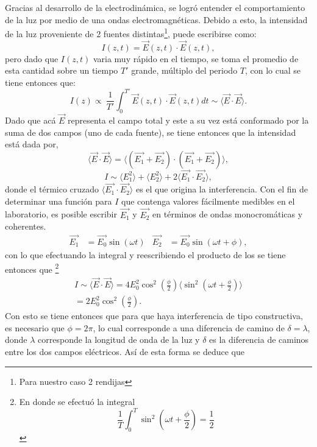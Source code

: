 \documentclass[%
 reprint,
 amsmath,amssymb,
 aps,
]{revtex4-1}
\begin{document}
Gracias al desarrollo de la electrodinámica, se logró entender el comportamiento de la luz por medio de una ondas electromagnéticas. Debido a esto, la intensidad de la luz proveniente de 2 fuentes distintas\footnote{Para nuestro caso 2 rendijas}, puede escribirse como:
\[I(z,t)=\vec{E}(z,t)\cdot \vec{E}(z,t),\]
pero dado que $I(z,t)$ varia muy rápido en el tiempo, se toma el promedio de esta cantidad sobre un tiempo $T'$ grande, múltiplo del periodo $T$, con lo cual se tiene entonces que:
\[I(z)\propto\ \frac{1}{T'}\int_{0}^{T'}\vec{E}(z,t)\cdot \vec{E}(z,t) dt \sim \langle \vec{E}\cdot \vec{E}\rangle.\]
Dado que acá $\vec{E}$ representa el campo total y este a su vez está conformado por la suma de dos campos (uno de cada fuente), se tiene entonces que la intensidad está dada por,
\begin{equation*}
  \langle \vec{E}\cdot \vec{E}\rangle = \langle (\vec{E_1}+\vec{E_2})\cdot (\vec{E_1}+\vec{E_2})\rangle,
\end{equation*}
\begin{equation}
I\sim \langle E_1^2\rangle+\langle E_2^2\rangle+2\langle \vec{E_1}\cdot  \vec{E_2}\rangle,
\label{difrac}
\end{equation}
donde el térmico cruzado $\langle \vec{E_1}\cdot  \vec{E_2}\rangle$ es el que origina la interferencia. Con el fin de determinar una función para $I$ que contenga valores fácilmente medibles en el laboratorio, es posible escribir $\vec{E_1}$ y $\vec{E_2}$ en términos de ondas monocromáticas y coherentes.
\begin{align}
\vec{E_1}&=\vec{E_0}\sin(\omega t)   &  \vec{E_2}&=\vec{E_0}\sin(\omega t+ \phi),
\label{campos electricos}
\end{align}
con lo que efectuando la integral y reescribiendo el producto de los  se tiene entonces que \footnote{En donde se efectuó la integral
\[ \frac{1}{T}\int_{0}^{T}\sin^2\left(\omega t+\frac{\phi}{2}\right)=\frac{1}{2}\]
}
\begin{multline}
I\sim  \langle \vec{E}\cdot \vec{E}\rangle = 4E_0^2 \cos^2\left(\frac{\phi}{2}\right)\langle\sin^2\left(\omega t+\frac{\phi}{2}\right)\rangle \\
=2E_0^2\cos^2\left(\frac{\phi}{2}\right).
\label{intensidad_1}
\end{multline}
Con esto se tiene entonces que para que haya interferencia de tipo constructiva, es necesario que $\phi=2\pi$, lo cual corresponde a una diferencia de camino de $\delta=\lambda$, donde $\lambda$ corresponde la longitud de onda de la luz y $\delta$ es la diferencia de caminos entre los dos campos eléctricos. Así de esta forma se deduce que
\end{document}
